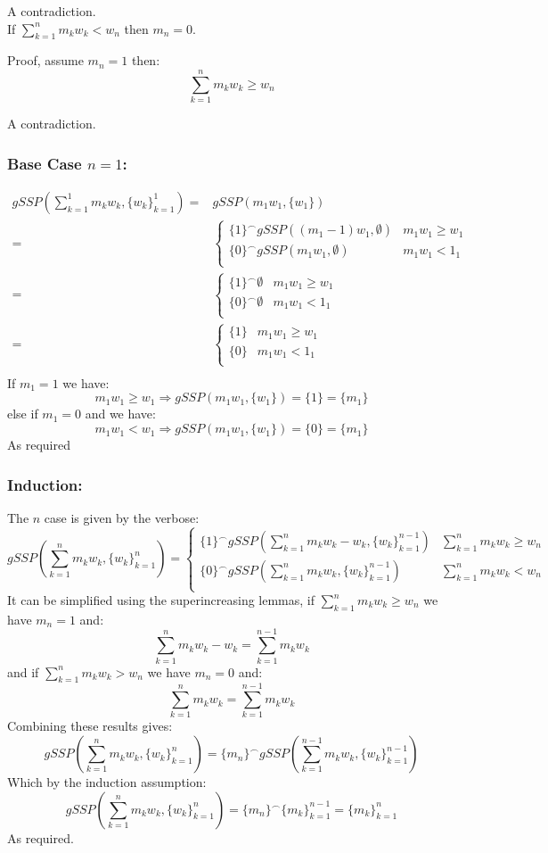 A contradiction.
\\
If $\sum_{k=1}^nm_kw_k < w_n$ then $m_n = 0$.

Proof, assume $m_n = 1$ then:
\[\sum_{k=1}^nm_kw_k \geq w_n\]

A contradiction.
\subsubsection{Base Case $n=1$:}

\begin{equation*}
\begin{aligned}
	gSSP\left(\sum_{k=1}^1m_kw_k,\{w_k\}_{k=1}^1\right) 
	=&gSSP\left(m_1w_1,\{w_1\}\right)\\
	=&\begin{cases} 
		\{1\}^\frown gSSP((m_1-1)w_1,\emptyset) & m_1w_1 \geq w_1\\
		\{0\}^\frown gSSP(m_1w_1,\emptyset) & m_1w_1 < 1_1\\
	\end{cases}\\
	=&\begin{cases} 
		\{1\}^\frown \emptyset & m_1w_1 \geq w_1\\
		\{0\}^\frown \emptyset & m_1w_1 < 1_1\\
	\end{cases}\\
	=&\begin{cases} 
		\{1\} & m_1w_1 \geq w_1\\
		\{0\} & m_1w_1 < 1_1\\
	\end{cases}\\
\end{aligned}
\end{equation*}
If $m_1=1$ we have:
\[m_1w_1\geq w_1 \Rightarrow gSSP(m_1w_1,\{w_1\}) = \{1\} = \{m_1\}\]
else if $m_1=0$ and we have:
\[m_1w_1 < w_1 \Rightarrow gSSP(m_1w_1,\{w_1\}) = \{0\} = \{m_1\}\]
As required 

\subsubsection{Induction:}
The $n$ case is given by the verbose:
\[gSSP\left(\sum_{k=1}^nm_kw_k,\{w_k\}_{k=1}^n\right) = 
	\begin{cases}
	\{1\}^\frown gSSP\left(\sum_{k=1}^nm_kw_k-w_k,\{w_k\}_{k=1}^{n-1}\right)& \sum_{k=1}^nm_kw_k \geq w_n \\
	\{0\}^\frown gSSP\left(\sum_{k=1}^nm_kw_k,\{w_k\}_{k=1}^{n-1}\right)& \sum_{k=1}^nm_kw_k < w_n \\
	\end{cases}
\]
It can be simplified using the superincreasing lemmas,
if $\sum_{k=1}^nm_kw_k \geq w_n $ we have $m_n = 1$ and:
\[\sum_{k=1}^nm_kw_k -w_k = \sum_{k=1}^{n-1}m_kw_k\]
and if $\sum_{k=1}^nm_kw_k > w_n $ we have $m_n = 0$ and:
\[\sum_{k=1}^nm_kw_k = \sum_{k=1}^{n-1}m_kw_k\]
Combining these results gives:
\[gSSP\left(\sum_{k=1}^nm_kw_k,\{w_k\}_{k=1}^n\right) = 
\{m_n\}^\frown gSSP\left(\sum_{k=1}^{n-1}m_kw_k,\{w_k\}_{k=1}^{n-1}\right)
\]
Which by the induction assumption:
\[gSSP\left(\sum_{k=1}^nm_kw_k,\{w_k\}_{k=1}^n\right) = \{m_n\}^\frown \{m_k\}_{k=1}^{n-1} = \{m_k\}_{k=1}^n\]
As required.

